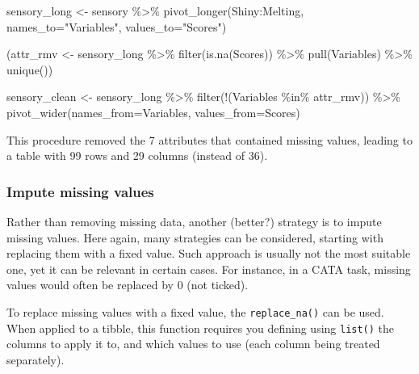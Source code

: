 \documentclass[
]{book}
\newenvironment{Shaded}{\begin{snugshade}}{\end{snugshade}}
\newcommand{\AttributeTok}[1]{\textcolor[rgb]{0.77,0.63,0.00}{#1}}
\newcommand{\FunctionTok}[1]{\textcolor[rgb]{0.00,0.00,0.00}{#1}}
\newcommand{\NormalTok}[1]{#1}
\newcommand{\OtherTok}[1]{\textcolor[rgb]{0.56,0.35,0.01}{#1}}
\newcommand{\SpecialCharTok}[1]{\textcolor[rgb]{0.00,0.00,0.00}{#1}}
\newcommand{\StringTok}[1]{\textcolor[rgb]{0.31,0.60,0.02}{#1}}
\begin{document}
\begin{Shaded}
\begin{Highlighting}[]
\NormalTok{sensory\_long }\OtherTok{\textless{}{-}}\NormalTok{ sensory }\SpecialCharTok{\%\textgreater{}\%} 
  \FunctionTok{pivot\_longer}\NormalTok{(Shiny}\SpecialCharTok{:}\NormalTok{Melting, }\AttributeTok{names\_to=}\StringTok{"Variables"}\NormalTok{, }\AttributeTok{values\_to=}\StringTok{"Scores"}\NormalTok{)}

\NormalTok{(attr\_rmv }\OtherTok{\textless{}{-}}\NormalTok{ sensory\_long }\SpecialCharTok{\%\textgreater{}\%} 
  \FunctionTok{filter}\NormalTok{(}\FunctionTok{is.na}\NormalTok{(Scores)) }\SpecialCharTok{\%\textgreater{}\%} 
  \FunctionTok{pull}\NormalTok{(Variables) }\SpecialCharTok{\%\textgreater{}\%} 
  \FunctionTok{unique}\NormalTok{())}

\NormalTok{sensory\_clean }\OtherTok{\textless{}{-}}\NormalTok{ sensory\_long }\SpecialCharTok{\%\textgreater{}\%} 
  \FunctionTok{filter}\NormalTok{(}\SpecialCharTok{!}\NormalTok{(Variables }\SpecialCharTok{\%in\%}\NormalTok{ attr\_rmv)) }\SpecialCharTok{\%\textgreater{}\%} 
  \FunctionTok{pivot\_wider}\NormalTok{(}\AttributeTok{names\_from=}\NormalTok{Variables, }\AttributeTok{values\_from=}\NormalTok{Scores)}
\end{Highlighting}
\end{Shaded}

This procedure removed the 7 attributes that contained missing values, leading to a table with 99 rows and 29 columns (instead of 36).

\hypertarget{impute-missing-values}{%
\subsubsection{Impute missing values}\label{impute-missing-values}}

Rather than removing missing data, another (better?) strategy is to impute missing values. Here again, many strategies can be considered, starting with replacing them with a fixed value. Such approach is usually not the most suitable one, yet it can be relevant in certain cases. For instance, in a CATA task, missing values would often be replaced by 0 (not ticked).

To replace missing values with a fixed value, the \texttt{replace\_na()} can be used. When applied to a tibble, this function requires you defining using \texttt{list()} the columns to apply it to, and which values to use (each column being treated separately).
\end{document}

